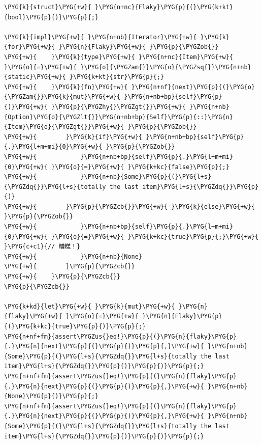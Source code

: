 \begin{Verbatim}[commandchars=\\\{\},breaklines=true,breakanywhere=true,fontsize=\codefont,xleftmargin=17bp]
\PYG{k}{struct}\PYG{+w}{ }\PYG{n+nc}{Flaky}\PYG{p}{(}\PYG{k+kt}{bool}\PYG{p}{)}\PYG{p}{;}

\PYG{k}{impl}\PYG{+w}{ }\PYG{n+nb}{Iterator}\PYG{+w}{ }\PYG{k}{for}\PYG{+w}{ }\PYG{n}{Flaky}\PYG{+w}{ }\PYG{p}{\PYGZob{}}
\PYG{+w}{    }\PYG{k}{type}\PYG{+w}{ }\PYG{n+nc}{Item}\PYG{+w}{ }\PYG{o}{=}\PYG{+w}{ }\PYG{o}{\PYGZam{}}\PYG{o}{\PYGZsq{}}\PYG{n+nb}{static}\PYG{+w}{ }\PYG{k+kt}{str}\PYG{p}{;}
\PYG{+w}{    }\PYG{k}{fn}\PYG{+w}{ }\PYG{n+nf}{next}\PYG{p}{(}\PYG{o}{\PYGZam{}}\PYG{k}{mut}\PYG{+w}{ }\PYG{n+nb+bp}{self}\PYG{p}{)}\PYG{+w}{ }\PYG{p}{\PYGZhy{}\PYGZgt{}}\PYG{+w}{ }\PYG{n+nb}{Option}\PYG{o}{\PYGZlt{}}\PYG{n+nb+bp}{Self}\PYG{p}{::}\PYG{n}{Item}\PYG{o}{\PYGZgt{}}\PYG{+w}{ }\PYG{p}{\PYGZob{}}
\PYG{+w}{        }\PYG{k}{if}\PYG{+w}{ }\PYG{n+nb+bp}{self}\PYG{p}{.}\PYG{l+m+mi}{0}\PYG{+w}{ }\PYG{p}{\PYGZob{}}
\PYG{+w}{            }\PYG{n+nb+bp}{self}\PYG{p}{.}\PYG{l+m+mi}{0}\PYG{+w}{ }\PYG{o}{=}\PYG{+w}{ }\PYG{k+kc}{false}\PYG{p}{;}
\PYG{+w}{            }\PYG{n+nb}{Some}\PYG{p}{(}\PYG{l+s}{\PYGZdq{}}\PYG{l+s}{totally the last item}\PYG{l+s}{\PYGZdq{}}\PYG{p}{)}
\PYG{+w}{        }\PYG{p}{\PYGZcb{}}\PYG{+w}{ }\PYG{k}{else}\PYG{+w}{ }\PYG{p}{\PYGZob{}}
\PYG{+w}{            }\PYG{n+nb+bp}{self}\PYG{p}{.}\PYG{l+m+mi}{0}\PYG{+w}{ }\PYG{o}{=}\PYG{+w}{ }\PYG{k+kc}{true}\PYG{p}{;}\PYG{+w}{ }\PYG{c+c1}{// 糟糕！}
\PYG{+w}{            }\PYG{n+nb}{None}
\PYG{+w}{        }\PYG{p}{\PYGZcb{}}
\PYG{+w}{    }\PYG{p}{\PYGZcb{}}
\PYG{p}{\PYGZcb{}}

\PYG{k+kd}{let}\PYG{+w}{ }\PYG{k}{mut}\PYG{+w}{ }\PYG{n}{flaky}\PYG{+w}{ }\PYG{o}{=}\PYG{+w}{ }\PYG{n}{Flaky}\PYG{p}{(}\PYG{k+kc}{true}\PYG{p}{)}\PYG{p}{;}
\PYG{n+nf+fm}{assert\PYGZus{}eq!}\PYG{p}{(}\PYG{n}{flaky}\PYG{p}{.}\PYG{n}{next}\PYG{p}{(}\PYG{p}{)}\PYG{p}{,}\PYG{+w}{ }\PYG{n+nb}{Some}\PYG{p}{(}\PYG{l+s}{\PYGZdq{}}\PYG{l+s}{totally the last item}\PYG{l+s}{\PYGZdq{}}\PYG{p}{)}\PYG{p}{)}\PYG{p}{;}
\PYG{n+nf+fm}{assert\PYGZus{}eq!}\PYG{p}{(}\PYG{n}{flaky}\PYG{p}{.}\PYG{n}{next}\PYG{p}{(}\PYG{p}{)}\PYG{p}{,}\PYG{+w}{ }\PYG{n+nb}{None}\PYG{p}{)}\PYG{p}{;}
\PYG{n+nf+fm}{assert\PYGZus{}eq!}\PYG{p}{(}\PYG{n}{flaky}\PYG{p}{.}\PYG{n}{next}\PYG{p}{(}\PYG{p}{)}\PYG{p}{,}\PYG{+w}{ }\PYG{n+nb}{Some}\PYG{p}{(}\PYG{l+s}{\PYGZdq{}}\PYG{l+s}{totally the last item}\PYG{l+s}{\PYGZdq{}}\PYG{p}{)}\PYG{p}{)}\PYG{p}{;}


\end{Verbatim}
